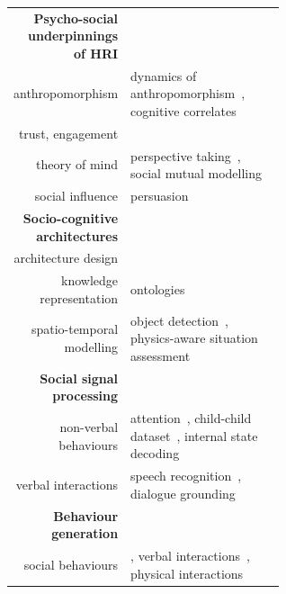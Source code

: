\documentclass[11pt,a4paper]{report}
\begin{document}
\begin{table}[h]
    \centering
    \begin{tabular}{rp{0.6\linewidth}}
        \toprule
        \textbf{Psycho-social underpinnings of HRI} \\  
        anthropomorphism & \small dynamics of
        anthropomorphism~\cite{lemaignan2014dynamics}, cognitive correlates~\cite{lemaignan2014cognitive} \\
        trust, engagement & \small \cite{flook2019impact,lemaignan2015youre,fink2014which} \\
        theory of mind & \small perspective taking~\cite{ros2010which, warnier2012when}, social mutual modelling~\cite{lemaignan2015mutual,dillenbourg2016symmetry} \\
        social influence & \small persuasion~\cite{winkle2019effective} \\
        \midrule
        \textbf{Socio-cognitive architectures} \\
        architecture design & \small \cite{lemaignan2017artificial, baxter2016cognitive,lemaignan2014challenges,lallee2012towards, mallet2010genom3} \\
        knowledge representation & \small
        ontologies~\cite{lemaignan2010oro, lemaignan2013explicit} \\    
        spatio-temporal modelling & \small object
        detection~\cite{wallbridge2017qualitative}, \newline physics-aware situation
        assessment~\cite{lemaignan2018underworlds,sallami2019simulation} \\
        \midrule
        \textbf{Social signal processing}\\
        non-verbal behaviours & \small attention~\cite{lemaignan2016realtime},
        child-child dataset~\cite{lemaignan2018pinsoro}, internal state decoding~\cite{bartlett2019what} \\
        verbal interactions & \small speech recognition~\cite{kennedy2017child}, dialogue grounding~\cite{lemaignan2011grounding} \\
        \midrule
        \textbf{Behaviour generation} \\
        social behaviours & \small \cite{lallee2011towards}, verbal interactions~\cite{wallbridge2019generating, wallbridge2019towards}, physical interactions~\cite{gharbi2013natural} \\

\end{tabular}
\end{table}
\end{document}
